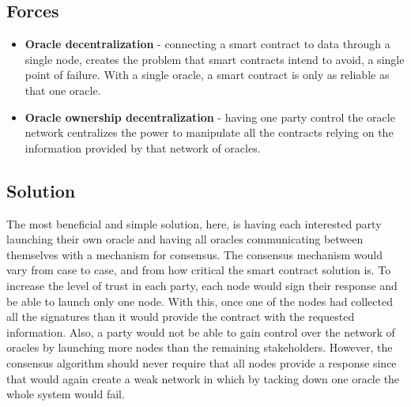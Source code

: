 \subsection{Forces}
\begin{itemize}
  \item \textbf{Oracle decentralization} - connecting a smart contract to data through a single node, creates the problem that smart contracts intend to avoid, a single point of failure. With a single oracle, a smart contract is only as reliable as that one oracle.
  \item \textbf{Oracle ownership decentralization} - having one party control the oracle network centralizes the power to manipulate all the contracts relying on the information provided by that network of oracles.
\end{itemize}

\subsection{Solution}
The most beneficial and simple solution, here, is having each interested party launching their own oracle and having all oracles communicating between themselves with a mechanism for consensus. The consensus mechanism would vary from case to case, and from how critical the smart contract solution is.
To increase the level of trust in each party, each node would sign their response and be able to launch only one node. With this, once one of the nodes had collected all the signatures than it would provide the contract with the requested information. Also, a party would not be able to gain control over the network of oracles by launching more nodes than the remaining stakeholders.
However, the consensus algorithm should never require that all nodes provide a response since that would again create a weak network in which by tacking down one oracle the whole system would fail.


